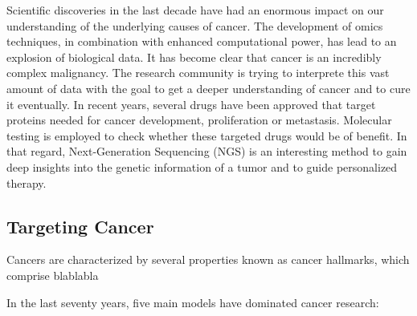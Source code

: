   Scientific discoveries in the last decade have had an enormous impact on our
  understanding of the underlying causes of cancer. The development of omics
  techniques, in combination with enhanced computational power, has lead to an
  explosion of biological data. It has become clear that cancer is an incredibly
  complex malignancy. The research community is trying to interprete this vast
  amount of data with the goal to get a deeper understanding of cancer and to
  cure it eventually. In recent years, several drugs have been approved that
  target proteins needed for cancer development, proliferation or metastasis.
  Molecular testing is employed to check whether these targeted drugs would be
  of benefit. In that regard, Next-Generation Sequencing (NGS) is an interesting
  method to gain deep insights into the genetic information of a tumor and to
  guide personalized therapy.

  \subsection{Targeting Cancer}

    Cancers are characterized by several properties known as cancer hallmarks, which
    comprise blablabla

    In the last seventy years, five main models have dominated cancer research:

